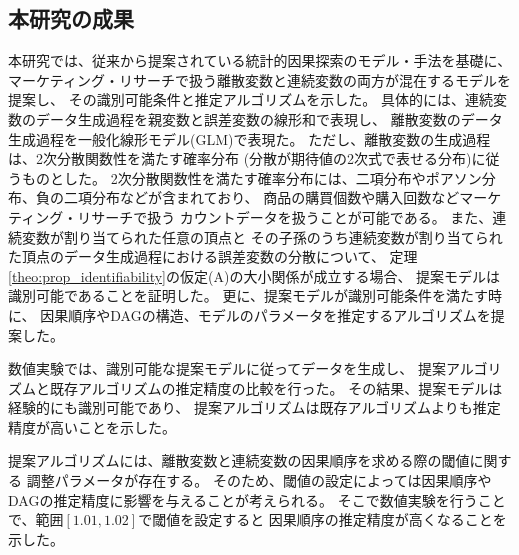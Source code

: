 
\subsection{本研究の成果}

本研究では、従来から提案されている統計的因果探索のモデル・手法を基礎に、
マーケティング・リサーチで扱う離散変数と連続変数の両方が混在するモデルを提案し、
その識別可能条件と推定アルゴリズムを示した。
具体的には、連続変数のデータ生成過程を親変数と誤差変数の線形和で表現し、
離散変数のデータ生成過程を一般化線形モデル(GLM)で表現た。
ただし、離散変数の生成過程は、2次分散関数性を満たす確率分布
(分散が期待値の2次式で表せる分布)に従うものとした。
2次分散関数性を満たす確率分布には、二項分布やポアソン分布、負の二項分布などが含まれており、
商品の購買個数や購入回数などマーケティング・リサーチで扱う
カウントデータを扱うことが可能である。
また、連続変数が割り当てられた任意の頂点と
その子孫のうち連続変数が割り当てられた頂点のデータ生成過程における誤差変数の分散について、
定理\ref{theo:prop_identifiability}の仮定(A)の大小関係が成立する場合、
提案モデルは識別可能であることを証明した。
更に、提案モデルが識別可能条件を満たす時に、
因果順序やDAGの構造、モデルのパラメータを推定するアルゴリズムを提案した。

数値実験では、識別可能な提案モデルに従ってデータを生成し、
提案アルゴリズムと既存アルゴリズムの推定精度の比較を行った。
その結果、提案モデルは経験的にも識別可能であり、
提案アルゴリズムは既存アルゴリズムよりも推定精度が高いことを示した。

提案アルゴリズムには、離散変数と連続変数の因果順序を求める際の閾値に関する
調整パラメータが存在する。
そのため、閾値の設定によっては因果順序やDAGの推定精度に影響を与えることが考えられる。
そこで数値実験を行うことで、範囲$[1.01, 1.02]$で閾値を設定すると
因果順序の推定精度が高くなることを示した。
